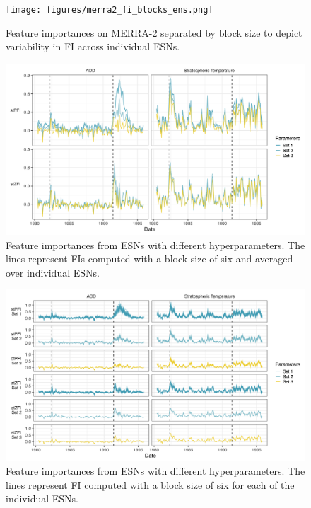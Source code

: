 \documentclass[AMS,STIX2COL]{WileyNJD-v2}
\begin{document}
\begin{figure}[h]
    \centering
    \texttt{[image: figures/merra2\_fi\_blocks\_ens.png]}
    \caption{Feature importances on MERRA-2 separated by block size to depict variability in FI across individual ESNs.}
    \label{fig:merra2block}
\end{figure}

\begin{figure}[h]
    \centering
    \includegraphics[width=\textwidth]{figures/merra2_fi_param_comparison.png}
    \caption{Feature importances from ESNs with different hyperparameters. The lines represent FIs computed with a block size of six and averaged over individual ESNs.}
    \label{fig:merra2fiparams}
\end{figure}

\begin{figure}[h]
    \centering
    \includegraphics[width=\textwidth]{figures/merra2_fi_param_var_comparison.png}
    \caption{Feature importances from ESNs with different hyperparameters. The lines represent FI computed with a block size of six for each of the individual ESNs.}
    \label{fig:merra2fiparamsvar}
\end{figure}
\end{document}
